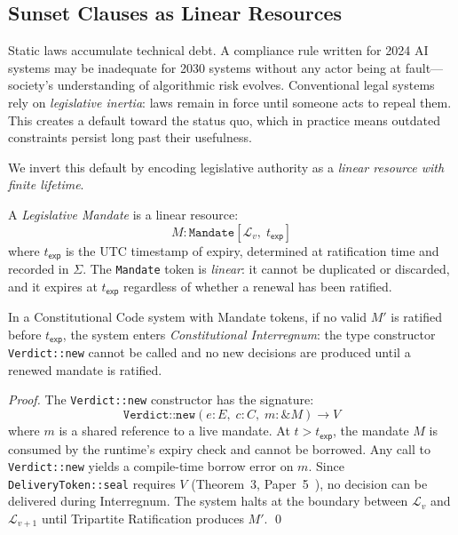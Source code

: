 \subsection{Sunset Clauses as Linear Resources}
\label{subsec:sunset}

Static laws accumulate technical debt. A compliance rule written for
2024 AI systems may be inadequate for 2030 systems without any actor
being at fault---society's understanding of algorithmic risk evolves.
Conventional legal systems rely on \emph{legislative inertia}: laws
remain in force until someone acts to repeal them. This creates a
default toward the status quo, which in practice means outdated
constraints persist long past their usefulness.

We invert this default by encoding legislative authority as a
\emph{linear resource with finite lifetime}.

\begin{definition}
\label{def:mandate}
A \emph{Legislative Mandate} is a linear resource:
\[
  M : \texttt{Mandate}[\mathcal{L}_v,\; t_{\mathsf{exp}}]
\]
where $t_{\mathsf{exp}}$ is the UTC timestamp of expiry,
determined at ratification time and recorded in $\Sigma$.
The \texttt{Mandate} token is \emph{linear}: it cannot be duplicated
or discarded, and it expires at $t_{\mathsf{exp}}$ regardless of
whether a renewal has been ratified.
\end{definition}

\begin{theorem}
\label{thm:sunset}
In a Constitutional Code system with Mandate tokens, if no valid
$M'$ is ratified before $t_{\mathsf{exp}}$, the system enters
\emph{Constitutional Interregnum}: the type constructor
\texttt{Verdict::new} cannot be called and no new decisions
are produced until a renewed mandate is ratified.
\end{theorem}

\begin{proof}
The \texttt{Verdict::new} constructor has the signature:
\[
  \texttt{Verdict::new}(e: E,\; c: C,\; m: \&M) \to V
\]
where $m$ is a shared reference to a live mandate. At $t >
t_{\mathsf{exp}}$, the mandate $M$ is consumed by the runtime's
expiry check and cannot be borrowed. Any call to
\texttt{Verdict::new} yields a compile-time borrow error on $m$.
Since \texttt{DeliveryToken::seal} requires $V$ (Theorem~3,
Paper~5~\cite{btv-cc}), no decision can be delivered during
Interregnum. The system halts at the boundary between
$\mathcal{L}_v$ and $\mathcal{L}_{v+1}$ until Tripartite
Ratification produces $M'$. \qed
\end{proof}

